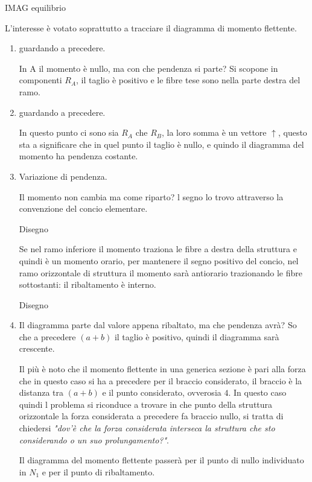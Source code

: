 \documentclass{article}
\begin{document}
\begin{adjustwidth}{2in}{}
	IMAG equilibrio
	
	L'interesse è votato soprattutto a tracciare il diagramma di momento flettente. \newline 
	
	\begin{enumerate}
		\item guardando a precedere. 
		
		In A il momento è nullo, ma con che pendenza si parte? Si scopone in componenti $R_A$, il taglio è positivo e le fibre tese sono nella parte destra del ramo.
		
		\item guardando a precedere. 
		
		In questo punto ci sono sia $R_A$ che $R_B$, la loro somma è un vettore $\uparrow$, questo sta a significare che in quel punto il taglio è nullo, e quindo il diagramma del momento ha pendenza costante.
		
		\item Variazione di pendenza. 
		
		Il momento non cambia ma come riparto? l segno lo trovo attraverso la convenzione del concio elementare.
		
		Disegno
		
		Se nel ramo inferiore il momento traziona le fibre a destra della struttura e quindi è un momento orario, per mantenere il segno positivo del concio, nel ramo orizzontale di struttura il momento sarà antiorario trazionando le fibre sottostanti: il ribaltamento è interno. 
		
		Disegno
		
		\item Il diagramma parte dal valore appena ribaltato, ma che pendenza avrà? So che a precedere $(a+b)$ il taglio è positivo, quindi il diagramma sarà crescente. 
		
		Il più è noto che il momento flettente in una generica sezione è pari alla forza che in questo caso si ha a precedere per il braccio considerato, il braccio è la distanza tra $(a+b)$ e il punto considerato, ovverosia $4$. In questo caso quindi l problema si riconduce a trovare in che punto della struttura orizzontale la forza considerata a precedere fa braccio nullo, si tratta di chiedersi \textit{"dov'è che la forza considerata interseca la struttura che sto considerando o un suo prolungamento?"}. 
		
		Il diagramma del momento flettente passerà per il punto di nullo individuato in $N_1$ e per il punto di ribaltamento. 
		

\end{enumerate}
\end{adjustwidth}
\end{document}
